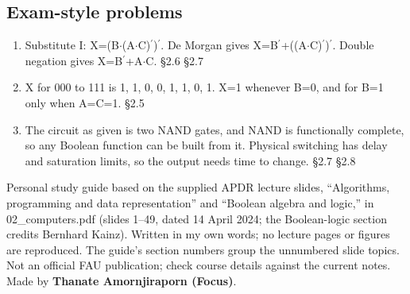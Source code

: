 \documentclass[11pt]{article}
\begin{document}
\begin{keepsection}\subsection{Exam-style problems}

\begin{enumerate}
\item Substitute I: X=(B\ensuremath{\cdot}(A\ensuremath{\cdot}C)\ensuremath{{}^{\prime}})\ensuremath{{}^{\prime}}. De Morgan gives X=B\ensuremath{{}^{\prime}}+((A\ensuremath{\cdot}C)\ensuremath{{}^{\prime}})\ensuremath{{}^{\prime}}. Double negation gives X=B\ensuremath{{}^{\prime}}+A\ensuremath{\cdot}C. \hfill{\small\color{FAUblue}§2.6} \hfill{\small\color{FAUblue}§2.7}
\item X for 000 to 111 is 1, 1, 0, 0, 1, 1, 0, 1. X=1 whenever B=0, and for B=1 only when A=C=1. \hfill{\small\color{FAUblue}§2.5}
\item The circuit as given is two NAND gates, and NAND is functionally complete, so any Boolean function can be built from it. Physical switching has delay and saturation limits, so the output needs time to change. \hfill{\small\color{FAUblue}§2.7} \hfill{\small\color{FAUblue}§2.8}
\end{enumerate}

\end{keepsection}

\vfill{\small Personal study guide based on the supplied APDR lecture slides, “Algorithms, programming and data representation” and “Boolean algebra and logic,” in 02\_computers.pdf (slides 1–49, dated 14 April 2024; the Boolean-logic section credits Bernhard Kainz). Written in my own words; no lecture pages or figures are reproduced. The guide's section numbers group the unnumbered slide topics. Not an official FAU publication; check course details against the current notes. Made by \textbf{Thanate Amornjiraporn (Focus)}.}
\end{document}
